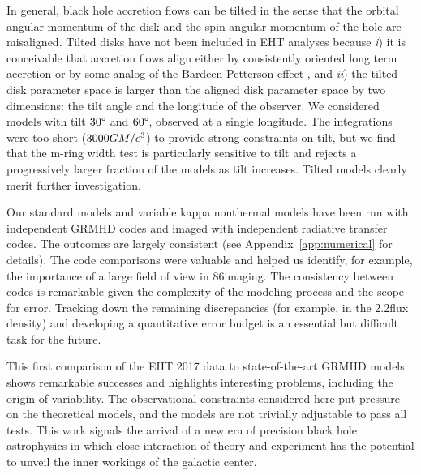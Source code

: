 In general, black hole accretion flows can be tilted in the sense that the orbital angular momentum of the disk and the spin angular momentum of the hole are misaligned.  Tilted disks have not been included in EHT analyses because \emph{i}) it is conceivable that accretion flows align either by consistently oriented long term accretion or by some analog of the Bardeen-Petterson effect \citep{1975ApJ...195L..65B}, and \emph{ii}) the tilted disk parameter space is larger than the aligned disk parameter space by two dimensions: the tilt angle and the longitude of the observer.  We considered models with tilt $30\degree$ and $60\degree$, observed at a single longitude.  The integrations were too short ($3000GM/c^3$) to provide strong constraints on tilt, but we find that the m-ring width test is particularly sensitive to tilt and rejects a progressively larger fraction of the models as tilt increases.  Tilted models clearly merit further investigation.

Our standard models and variable kappa nonthermal models have been run with independent GRMHD codes and imaged with independent radiative transfer codes.  The outcomes are largely consistent (see Appendix~\ref{app:numerical} for details).  The code comparisons were valuable and helped us identify, for example, the importance of a large field of view in 86\GHz imaging.  The consistency between codes is remarkable given the complexity of the modeling process and the scope for error.  Tracking down the remaining discrepancies (for example, in the 2.2\um flux density) and developing a quantitative error budget is an essential but difficult task for the future.

This first comparison of the EHT 2017 \sgra data to state-of-the-art GRMHD models shows remarkable successes and highlights interesting problems, including the origin of variability.  The observational constraints considered here put pressure on the theoretical models, and the models are not trivially adjustable to pass all tests.  This work signals the arrival of a new era of precision black hole astrophysics in which close interaction of theory and experiment has the potential to unveil the inner workings of the galactic center.
